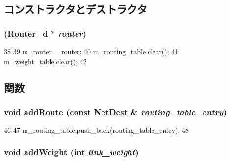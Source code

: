 \subsection{コンストラクタとデストラクタ}
\hypertarget{classRoutingUnit__d_a57d4fd4ad1e1f1ba24dd307ecbabd5b1}{
\subsubsection[{RoutingUnit\_\-d}]{ ({\bf Router\_\-d} $\ast$ {\em router})}}
\label{classRoutingUnit__d_a57d4fd4ad1e1f1ba24dd307ecbabd5b1}



\begin{DoxyCode}
38 {
39     m_router = router;
40     m_routing_table.clear();
41     m_weight_table.clear();
42 }
\end{DoxyCode}


\subsection{関数}
\hypertarget{classRoutingUnit__d_a7f392ab35c8e59678ab340df9910cf01}{
\subsubsection[{addRoute}]{\setlength{\rightskip}{0pt plus 5cm}void addRoute (const {\bf NetDest} \& {\em routing\_\-table\_\-entry})}}
\label{classRoutingUnit__d_a7f392ab35c8e59678ab340df9910cf01}



\begin{DoxyCode}
46 {
47     m_routing_table.push_back(routing_table_entry);
48 }
\end{DoxyCode}
\hypertarget{classRoutingUnit__d_a44fd0199b386c22818a7858cef6ae39b}{
\subsubsection[{addWeight}]{\setlength{\rightskip}{0pt plus 5cm}void addWeight (int {\em link\_\-weight})}}
\label{classRoutingUnit__d_a44fd0199b386c22818a7858cef6ae39b}



